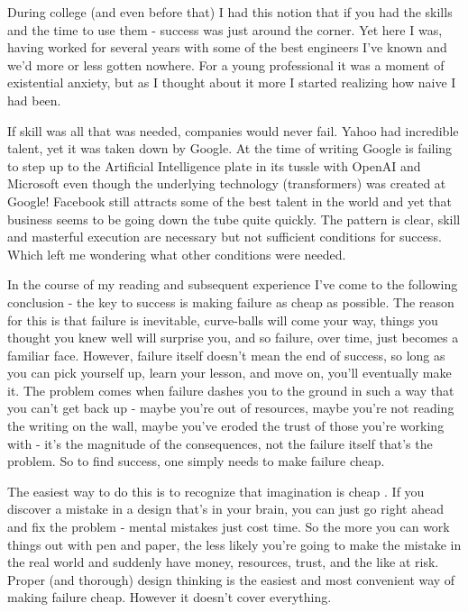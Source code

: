 \documentclass[11pt]{book}
\begin{document}
During college (and even before that) I had this notion that if you had the skills and the time to use them - success was just around the corner. Yet here I was, having worked for several years with some of the best engineers I've known and we'd more or less gotten nowhere. For a young professional it was a moment of existential anxiety, but as I thought about it more I started realizing how naive I had been.
\newline

If skill was all that was needed, companies would never fail. Yahoo had incredible talent, yet it was taken down by Google. At the time of writing Google is failing to step up to the Artificial Intelligence plate in its tussle with OpenAI and Microsoft even though the underlying technology (transformers) was created at Google! Facebook still attracts some of the best talent in the world and yet that business seems to be going down the tube quite quickly. The pattern is clear, skill and masterful execution are necessary but not sufficient conditions for success. Which left me wondering what other conditions were needed.
\newline

In the course of my reading and subsequent experience I've come to the following conclusion - the key to success is making failure as cheap as possible. The reason for this is that failure is inevitable, curve-balls will come your way, things you thought you knew well will surprise you, and so failure, over time, just becomes a familiar face. However, failure itself doesn't mean the end of success, so long as you can pick yourself up, learn your lesson, and move on, you'll eventually make it. The problem comes when failure dashes you to the ground in such a way that you can't get back up - maybe you're out of resources, maybe you're not reading the writing on the wall, maybe you've eroded the trust of those you're working with - it's the magnitude of the consequences, not the failure itself that's the problem. So to find success, one simply needs to make failure cheap.
\newline

The easiest way to do this is to recognize that imagination is cheap \cite{macmillan}. If you discover a mistake in a design that's in your brain, you can just go right ahead and fix the problem - mental mistakes just cost time. So the more you can work things out with pen and paper, the less likely you're going to make the mistake in the real world and suddenly have money, resources, trust, and the like at risk. Proper (and thorough) design thinking is the easiest and most convenient way of making failure cheap. However it doesn't cover everything.
\newline
\end{document}
